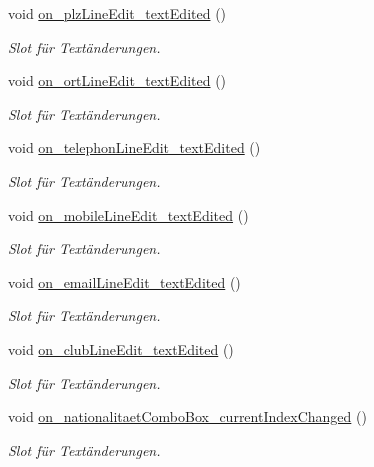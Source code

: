 \begin{CompactItemize}
void \hyperlink{class_r_f_i_d_input_dialog_6136d9ac2c0400239d01f06269fb1865}{on\_\-plzLineEdit\_\-textEdited} ()
\begin{CompactList}\small\item\em Slot für Textänderungen. \item\end{CompactList}\item 
void \hyperlink{class_r_f_i_d_input_dialog_159c213b7684ba916d9c047c76fab2e5}{on\_\-ortLineEdit\_\-textEdited} ()
\begin{CompactList}\small\item\em Slot für Textänderungen. \item\end{CompactList}\item 
void \hyperlink{class_r_f_i_d_input_dialog_ca45d88bae73e41a219177aeb471b789}{on\_\-telephonLineEdit\_\-textEdited} ()
\begin{CompactList}\small\item\em Slot für Textänderungen. \item\end{CompactList}\item 
void \hyperlink{class_r_f_i_d_input_dialog_0d12ce25f1a516e1c219400e176c3955}{on\_\-mobileLineEdit\_\-textEdited} ()
\begin{CompactList}\small\item\em Slot für Textänderungen. \item\end{CompactList}\item 
void \hyperlink{class_r_f_i_d_input_dialog_e5e5058e55f652dab0d33f9e7ea563ae}{on\_\-emailLineEdit\_\-textEdited} ()
\begin{CompactList}\small\item\em Slot für Textänderungen. \item\end{CompactList}\item 
void \hyperlink{class_r_f_i_d_input_dialog_833c3a68aeee5cfc0ecdd420e2a13a89}{on\_\-clubLineEdit\_\-textEdited} ()
\begin{CompactList}\small\item\em Slot für Textänderungen. \item\end{CompactList}\item 
void \hyperlink{class_r_f_i_d_input_dialog_34a7d69970ebded23245a780906fd893}{on\_\-nationalitaetComboBox\_\-currentIndexChanged} ()
\begin{CompactList}\small\item\em Slot für Textänderungen. \item\end{CompactList}\item 

\end{CompactItemize}
